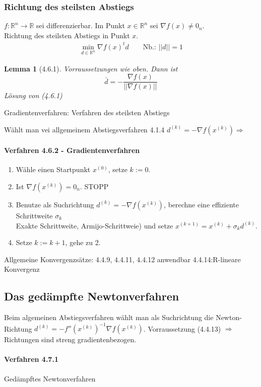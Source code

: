 \documentclass[ngerman,halfparskip]{scrartcl}
\newtheorem*{lemma}{Lemma}
\theoremstyle{definition}
\def\R{\mathbb R}
\begin{document}
\subsubsection*{Richtung des steilsten Abstiegs} 
$f:\R^n\rightarrow \R$ sei differenzierbar. Im Punkt $x\in\R^n$ sei $\nabla f(x)\neq 0_n$.\\
Richtung des steilsten Abstiegs in Punkt $x$.
\begin{gather*}\tag{4.6.1}
\min\limits_{d\in\R^n}\nabla f(x)^td \qquad \text{Nb.: }||d||=1
\end{gather*}

\begin{lemma}[4.6.1]
Vorraussetzungen wie oben. Dann ist 
$$\bar d = - \frac {\nabla f(x)}{||\nabla f(x)||}$$
Lösung von (4.6.1)
\end{lemma}
Gradientenverfahren: Verfahren des steilsten Abstiegs

Wählt man vei allgemeinem Abstiegsverfahren 4.1.4 $d^{(k)}=-\nabla f(x^{(k)}) \Rightarrow$
\paragraph{Verfahren 4.6.2 - Gradientenverfahren} 
\begin{enumerate}
\item Wähle einen Startpunkt $x^{(0)}$, setze $k:=0$.
\item Ist $\nabla f (x^{(k)})=0_n$. STOPP
\item Benutze als Suchrichtung $d^{(k)}=-\nabla f(x^{(k)})$, berechne eine effiziente Schrittweite $\sigma_k$\\
Exakte Schrittweite, Armijo-Schrittweie) und setze $x^{(k+1)}=x^{(k)}+\sigma_k d^{(k)}$.
\item Setze $k:=k+1$, gehe zu 2.
\end{enumerate}

Allgemeine Konvergenzsätze: 4.4.9, 4.4.11, 4.4.12 anwendbar 4.4.14:R-lineare Konvergenz

\subsection*{Das gedämpfte Newtonverfahren}
Beim algemeinen Abstiegsverfahren wählt man als Suchrichtung die Newton-Richtung $d^{(k)}=-f''(x^{(k)})^{-1}\nabla f(x^{(k)})$. Vorraussetzung (4.4.13) $\Rightarrow$ Richtungen sind streng gradientenbezogen.

\paragraph{Verfahren 4.7.1} Gedämpftes Newtonverfahren
\end{document}
